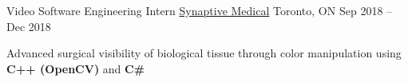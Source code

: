 \documentclass[]{awesome-cv}
\begin{document}
\begin{cventries}
{\begin{cvitems}
		\end{cvitems}}
	\cventry
	{Video Software Engineering Intern}
	{\href{https://www.synaptivemedical.com/}{Synaptive Medical}}
	{Toronto, ON}
	{Sep 2018 – Dec 2018}
	{\begin{cvitems}
		\item {Advanced surgical visibility of biological tissue through color manipulation using \textbf{C++ (OpenCV)} and \textbf{C\#}}
		\end{cvitems}}
\end{cventries}
\end{document}
